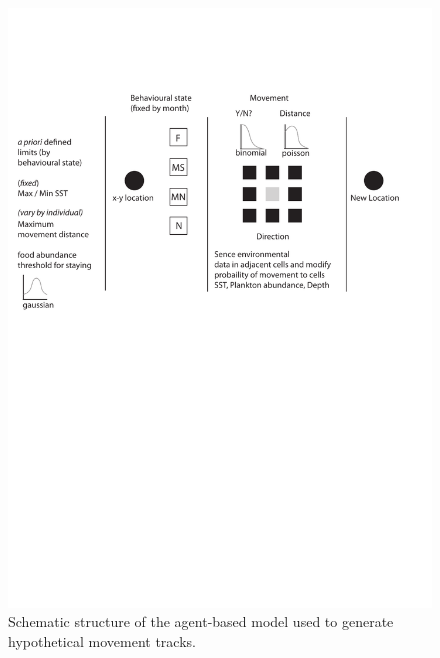\documentclass[a4paper,12pt]{article}
\begin{document}
\begin{landscape}

  \vspace{-1cm}
\begin{figure}[!htbp]
  \centering
  \includegraphics[trim = 0cm 145mm 0cm 4cm, clip]{figures/flow-diagram-model.pdf}
  \vspace{-1.2cm}
  \linespread{0.8}
  \caption{
  Schematic structure of the agent-based model used to generate hypothetical movement tracks. 
}
\end{figure}
\end{landscape}
\end{document}
